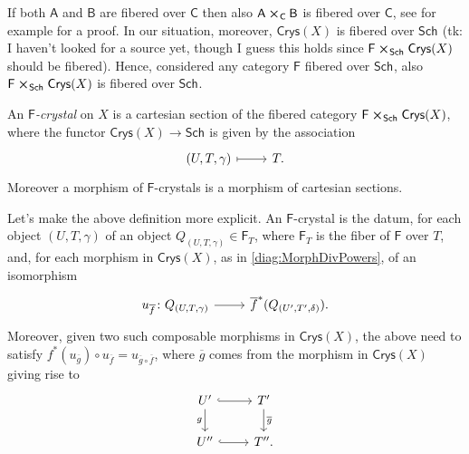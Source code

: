 \documentclass[../Main]{subfiles}
\begin{document}
\begin{rem}[]
	If both $\mathsf{A}$ and $\mathsf{B}$ are fibered over $\mathsf{C}$ then
	also $\mathsf{A} \cross_{ \mathsf{C} } \mathsf{B}$ is fibered over $\mathsf{C}$,
	see for example
	\cite[\href{https://stacks.math.columbia.edu/tag/02XQ}{Lemma 02XQ}]{SP}
	for a proof.
	In our situation, moreover, $\mathsf{Crys}(X)$ is fibered over $\mathsf{Sch}_{  }$
	(tk: I haven't looked for a source yet, though I guess this holds since
	$\mathsf{F} \cross_{ \mathsf{Sch}_{  } } \mathsf{Crys}(X)$ should be fibered).
	Hence, considered any category $\mathsf{F}$ fibered over $\mathsf{Sch}_{  }$,
	also $\mathsf{F} \cross_{ \mathsf{Sch}_{  } } \mathsf{Crys}(X)$
	is fibered over $\mathsf{Sch}_{ }$.
\end{rem}


\begin{defn}
	An {\em $\mathsf{F}$-crystal} on $X$ is a
	cartesian section of the fibered category
	$\mathsf{F} \cross_{ \mathsf{Sch}_{  } } \mathsf{Crys}(X)$, where
	the functor $\mathsf{Crys}(X) \to \mathsf{Sch}_{  }$ is given
	by the association
	\begin{equation*}
	\begin{tikzcd}[row sep = 0ex
		,/tikz/column 1/.append style={anchor=base east}
		,/tikz/column 2/.append style={anchor=base west}]
		\left(U, T, \gamma\right) \arrow[r, "", mapsto] & T
	.\end{tikzcd}
	\end{equation*} 
	Moreover a morphism of $\mathsf{F}$-crystals is a
	morphism of cartesian sections.
\end{defn}


\begin{rem}[]
	Let's make the above definition more explicit.
	An $\mathsf{F}$-crystal is the datum, for each object
	$\left(U, T, \gamma\right)$ of an object
	$Q_{\left(U, T, \gamma\right)} \in \mathsf{F}_T$, where
	$\mathsf{F}_T$ is the fiber of $\mathsf{F}$ over $T$,
	and, for each morphism in $\mathsf{Crys}(X)$, as in \cref{diag:MorphDivPowers},
	of an isomorphism
	\begin{equation*}
	\begin{tikzcd}[row sep = 0ex
		,/tikz/column 1/.append style={anchor=base east}
		,/tikz/column 2/.append style={anchor=base west}]
		u_{\overline{f}}\colon 
		Q_{\left(U, T, \gamma\right)}
		\arrow[r, "", rightarrow] &
		\overline{f}^* (Q_{\left(U', T', \delta \right)})
	.\end{tikzcd}
	\end{equation*} 
	Moreover, given two such composable morphisms in $\mathsf{Crys}(X)$,
	the above need to satisfy $f^*(u_{\overline{g}}) \circ u_{\overline{f}} =
	u_{\overline{g} \circ \overline{f}}$,
	where $\overline{g}$ comes from the morphism
	in $\mathsf{Crys}(X)$ giving rise to
	\begin{equation*}
	\begin{tikzcd}
		U' \arrow[d, "g"', rightarrow] \arrow[r, "", hookrightarrow] &
		T' \arrow[d, "\overline{g}", rightarrow] \\
		U'' \arrow[r, "", hookrightarrow] &
		T''
	.\end{tikzcd}
	\end{equation*}
\end{rem}
\end{document}

